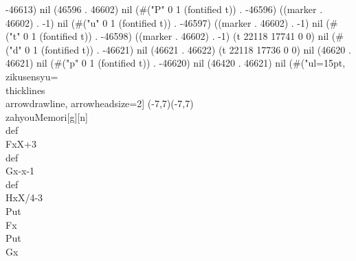 -46613) nil (46596 . 46602) nil (#("P" 0 1 (fontified t)) . -46596) ((marker . 46602) . -1) nil (#("u" 0 1 (fontified t)) . -46597) ((marker . 46602) . -1) nil (#("t" 0 1 (fontified t)) . -46598) ((marker . 46602) . -1) (t 22118 17741 0 0) nil (#("d" 0 1 (fontified t)) . -46621) nil (46621 . 46622) (t 22118 17736 0 0) nil (46620 . 46621) nil (#("p" 0 1 (fontified t)) . -46620) nil (46420 . 46621) nil (#("ul=15pt,%
    zikusensyu=\\thicklines\\arrowdrawline,%
    arrowheadsize=2]
    (-7,7)(-7,7)%
    \\zahyouMemori[g][n]%
    \\def\\Fx{X+3}
    \\def\\Gx{-x-1}
    \\def\\Hx{X/4-3}
    \\Put\\Fx
    \\Put\\Gx
